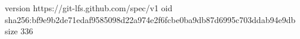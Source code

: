 version https://git-lfs.github.com/spec/v1
oid sha256:bf9e9b2de71edaf9585098d22a974e2f6fcbe0ba9db87d6995c703ddab94e9db
size 336
